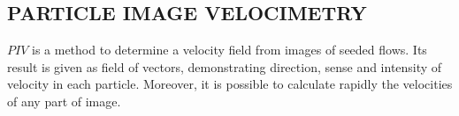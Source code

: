 
\subsection{PARTICLE IMAGE VELOCIMETRY}

$PIV$ is a method to determine a velocity field from images of seeded 
flows\cite{Bastiaans}.
Its result is given as field of vectors, demonstrating direction, sense and 
intensity of velocity in each particle. 
Moreover, it is possible to calculate rapidly the velocities of any part of image.\\
